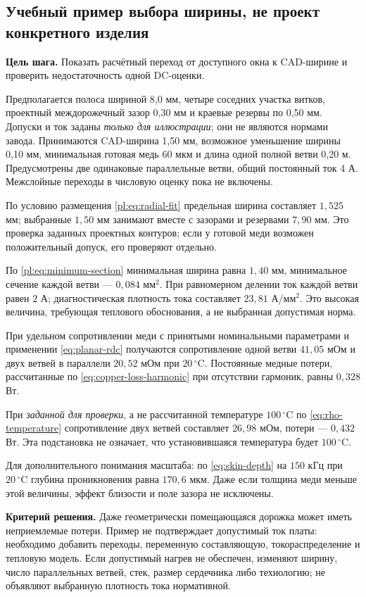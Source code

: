 \documentclass[14pt,a4paper]{extarticle}
\newcommand{\criterion}{\par\noindent\textbf{Критерий решения.} }
\newcommand{\stepgoal}[1]{\par\noindent\textbf{Цель шага.} #1\par}
\begin{document}
\subsection{Учебный пример выбора ширины, не проект конкретного изделия}
\stepgoal{Показать расчётный переход от доступного окна к CAD-ширине и проверить недостаточность одной DC-оценки.}
Предполагается полоса шириной 8,0 мм, четыре соседних участка витков, проектный междорожечный зазор 0,30 мм и краевые резервы по 0,50 мм. Допуски и ток заданы \emph{только для иллюстрации}; они не являются нормами завода. Принимаются CAD-ширина 1,50 мм, возможное уменьшение ширины 0,10 мм, минимальная готовая медь 60 мкм и длина одной полной ветви 0,20 м. Предусмотрены две одинаковые параллельные ветви, общий постоянный ток 4 А. Межслойные переходы в числовую оценку пока не включены.

По условию размещения \eqref{pl:eq:radial-fit} предельная ширина составляет $1{,}525$ мм; выбранные $1{,}50$ мм занимают вместе с зазорами и резервами $7{,}90$ мм. Это проверка заданных проектных контуров; если у готовой меди возможен положительный допуск, его проверяют отдельно.

По \eqref{pl:eq:minimum-section} минимальная ширина равна $1{,}40$ мм, минимальное сечение каждой ветви --- $0{,}084$ мм$^2$. При равномерном делении ток каждой ветви равен $2$ А; диагностическая плотность тока составляет $23{,}81$ А/мм$^2$. Это высокая величина, требующая теплового обоснования, а не выбранная допустимая норма.

При удельном сопротивлении меди с принятыми номинальными параметрами и применении \eqref{eq:planar-rdc} получаются сопротивление одной ветви $41{,}05$ мОм и двух ветвей в параллели $20{,}52$ мОм при $20\,^{\circ}\mathrm C$. Постоянные медные потери, рассчитанные по \eqref{eq:copper-loss-harmonic} при отсутствии гармоник, равны $0{,}328$ Вт.

При \emph{заданной для проверки}, а не рассчитанной температуре $100\,^{\circ}\mathrm C$ по \eqref{eq:rho-temperature} сопротивление двух ветвей составляет $26{,}98$ мОм, потери --- $0{,}432$ Вт. Эта подстановка не означает, что установившаяся температура будет $100\,^{\circ}\mathrm C$.

Для дополнительного понимания масштаба: по \eqref{eq:skin-depth} на $150$ кГц при $20\,^{\circ}\mathrm C$ глубина проникновения равна $170{,}6$ мкм. Даже если толщина меди меньше этой величины, эффект близости и поле зазора не исключены.


\criterion Даже геометрически помещающаяся дорожка может иметь неприемлемые потери. Пример не подтверждает допустимый ток платы: необходимо добавить переходы, переменную составляющую, токораспределение и тепловую модель. Если допустимый нагрев не обеспечен, изменяют ширину, число параллельных ветвей, стек, размер сердечника либо технологию; не объявляют выбранную плотность тока нормативной.
\end{document}
